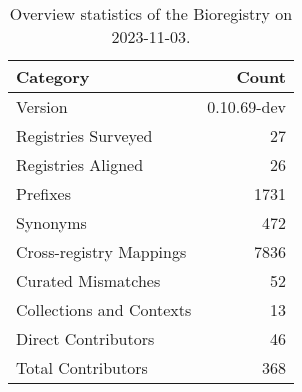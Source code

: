\begin{table}
\caption{Overview statistics of the Bioregistry on 2023-11-03.}
\label{tab:bioregistry-summary}
\begin{tabular}{lr}
\toprule
Category & Count \\
\midrule
Version & 0.10.69-dev \\
Registries Surveyed & 27 \\
Registries Aligned & 26 \\
Prefixes & 1731 \\
Synonyms & 472 \\
Cross-registry Mappings & 7836 \\
Curated Mismatches & 52 \\
Collections and Contexts & 13 \\
Direct Contributors & 46 \\
Total Contributors & 368 \\
\bottomrule
\end{tabular}
\end{table}
